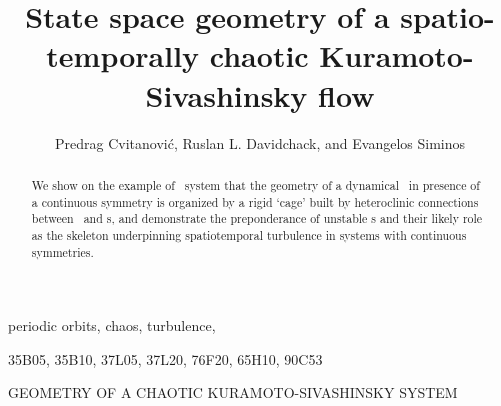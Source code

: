 \documentclass{siamltex}          %
\begin{document}
                \title{
State space geometry of a spatio-temporally chaotic
Kuramoto-Sivashinsky flow
                 }
                  \author{
Predrag Cvitanovi\'c\footnotemark[1],
Ruslan L. Davidchack\footnotemark[2],
    and
Evangelos Siminos\footnotemark[1]
                    }


                \maketitle

\renewcommand{\thefootnote}{\fnsymbol{footnote}}
\renewcommand{\thefootnote}{\arabic{footnote}}

                \begin{abstract}
We show on the example of \KS\ system
that the geometry of a dynamical \statesp\ in presence of
a continuous symmetry is organized by
a rigid `cage' built by heteroclinic connections
between \eqva\ and \rpo s, and demonstrate the
preponderance of unstable \rpo s and their likely
role as the skeleton underpinning spatiotemporal turbulence in
systems with continuous symmetries.
                \end{abstract}

\begin{keywords}
periodic orbits, chaos, turbulence, {\KSe}
\end{keywords}

\begin{AMS}
35B05, 35B10, 37L05, 37L20, 76F20, 65H10, 90C53
\end{AMS}

\pagestyle{myheadings}
\thispagestyle{plain}
         {GEOMETRY OF A CHAOTIC KURAMOTO-SIVASHINSKY SYSTEM}
\end{document}
